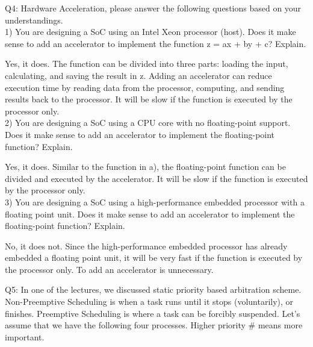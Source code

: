 \documentclass[a4paper]{article}
\begin{document}
Q4: Hardware Acceleration, please answer the following questions based on your understandings.\\
1) You are designing a SoC using an Intel Xeon processor (host). Does it make sense to add an accelerator to implement the function z = ax + by + c? Explain.

Yes, it does. The function can be divided into three parts: loading the input, calculating, and saving the result in z. Adding an accelerator can reduce execution time by reading data from the processor, computing, and sending results back to the processor. It will be slow if the function is executed by the processor only.\\
2) You are designing a SoC using a CPU core with no floating-point support. Does it make sense to add an accelerator to implement the floating-point function? Explain.

Yes, it does. Similar to the function in a), the floating-point function can be divided and executed by the accelerator. It will be slow if the function is executed by the processor only.\\
3) You are designing a SoC using a high-performance embedded processor with a floating point unit. Does it make sense to add an accelerator to implement the floating-point function? Explain.

No, it does not. Since the high-performance embedded processor has already embedded a floating point unit, it will be very fast if the function is executed by the processor only. To add an accelerator is unnecessary.

Q5: In one of the lectures, we discussed static priority based arbitration scheme. Non-Preemptive Scheduling is when a task runs until it stops (voluntarily), or finishes. Preemptive Scheduling is where a task can be forcibly suspended. Let’s assume that we have the following four processes. Higher priority \# means more important.
\end{document}

